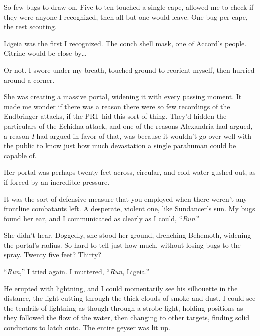 So few bugs to draw on.  Five to ten touched a single cape, allowed me to check if they were anyone I recognized, then all but one would leave.  One bug per cape, the rest scouting.



Ligeia was the first I recognized.  The conch shell mask, one of Accord's people.  Citrine would be close by\ldots



Or not.  I swore under my breath, touched ground to reorient myself, then hurried around a corner.



She was creating a massive portal, widening it with every passing moment.  It made me wonder if there was a reason there were so few recordings of the Endbringer attacks, if the PRT hid this sort of thing.  They'd hidden the particulars of the Echidna attack, and one of the reasons Alexandria had argued, a reason \emph{I} had argued in favor of that, was because it wouldn't go over well with the public to know just how much devastation a single parahuman could be capable of.



Her portal was perhaps twenty feet across, circular, and cold water gushed out, as if forced by an incredible pressure.



It was the sort of defensive measure that you employed when there weren't any frontline combatants left.  A desperate, violent one, like Sundancer's sun.  My bugs found her ear, and I communicated as clearly as I could, ``\emph{Run}.''



She didn't hear.  Doggedly, she stood her ground, drenching Behemoth, widening the portal's radius.  So hard to tell just how much, without losing bugs to the spray.  Twenty five feet?  Thirty?



``\emph{Run},'' I tried again.  I muttered, ``\emph{Run}, Ligeia.''



He erupted with lightning, and I could momentarily see his silhouette in the distance, the light cutting through the thick clouds of smoke and dust.  I could see the tendrils of lightning as though through a strobe light, holding positions as they followed the flow of the water, then changing to other targets, finding solid conductors to latch onto.  The entire geyser was lit up.



